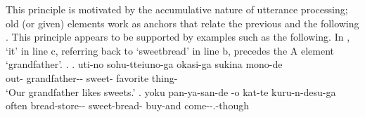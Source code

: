 This principle is motivated by the accumulative nature of utterance processing;
old (or given) elements work as anchors that relate
the previous  and the following .
This principle appears to be supported by examples such as the following.
%
In \Next,
 `it' in line c, referring back to  `sweetbread' in line b, precedes the A element  `grandfather'.
%
\largerpage
\ex. \label{PronIni1}
 \ag. uti-no sohu-tteiuno-ga okasi-ga sukina mono-de \\
 		out- grandfather-- sweet- favorite thing- \\
		`Our grandfather likes sweets.'
 \bg. yoku pan-ya-san-de -o kat-te kuru-n-desu-ga \\
   often bread-store-- sweet-bread- buy-and come--.-though \\

